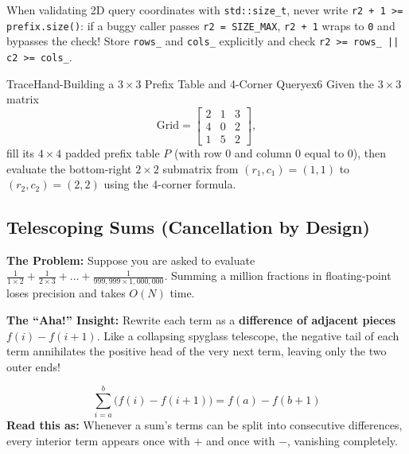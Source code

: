 \documentclass[11pt,a4paper]{article}
\theoremstyle{definition}
\newcommand{\painbeat}{\textbf{\color{accentamber}The Problem:} }
\newcommand{\ahabeat}{\textbf{\color{accentteal}The ``Aha!'' Insight:} }
\begin{document}
\begin{watchoutbox}
When validating 2D query coordinates with \texttt{std::size\_t}, never write \texttt{r2 + 1 >= prefix.size()}: if a buggy caller passes \texttt{r2 = SIZE\_MAX}, \texttt{r2 + 1} wraps to \texttt{0} and bypasses the check! Store \texttt{rows\_} and \texttt{cols\_} explicitly and check \texttt{r2 >= rows\_ || c2 >= cols\_}.
\end{watchoutbox}

\begin{tryitbox}{Trace}{Hand-Building a $3 \times 3$ Prefix Table and 4-Corner Query}{ex6}
Given the $3 \times 3$ matrix
\[
    \text{Grid} = \begin{bmatrix} 2 & 1 & 3 \\ 4 & 0 & 2 \\ 1 & 5 & 2 \end{bmatrix},
\]
fill its $4 \times 4$ padded prefix table $P$ (with row $0$ and column $0$ equal to $0$), then evaluate the bottom-right $2 \times 2$ submatrix from $(r_1, c_1) = (1, 1)$ to $(r_2, c_2) = (2, 2)$ using the 4-corner formula.
\end{tryitbox}

\subsection{Telescoping Sums (Cancellation by Design)}

\painbeat Suppose you are asked to evaluate $\frac{1}{1 \times 2} + \frac{1}{2 \times 3} + \dots + \frac{1}{999{,}999 \times 1{,}000{,}000}$. Summing a million fractions in floating-point loses precision and takes $O(N)$ time.

\ahabeat Rewrite each term as a \textbf{difference of adjacent pieces} $f(i) - f(i + 1)$. Like a collapsing spyglass telescope, the negative tail of each term annihilates the positive head of the very next term, leaving only the two outer ends!

\begin{formulabox}
\[
    \sum_{i=a}^{b} \bigl(f(i) - f(i + 1)\bigr) = f(a) - f(b + 1)
\]
\textbf{Read this as:} Whenever a sum's terms can be split into consecutive differences, every interior term appears once with $+$ and once with $-$, vanishing completely.
\end{formulabox}
\end{document}
